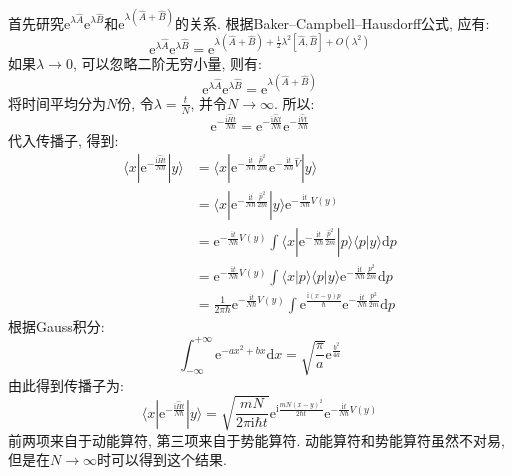         首先研究$\mathrm{e}^{\lambda \hat{A}}\mathrm{e}^{\lambda \hat{B}}$和$\mathrm{e}^{\lambda (\hat{A}+\hat{B})}$的关系. 根据Baker–Campbell–Hausdorff公式, 应有:
        \begin{equation}
            \mathrm{e}^{\lambda \hat{A}} \mathrm{e}^{\lambda \hat{B}} = \mathrm{e}^{\lambda (\hat{A}+\hat{B}) + \frac 12 \lambda^2 [\hat{A},\hat{B}] + O(\lambda^2)}
        \end{equation}
        如果$\lambda \to 0$, 可以忽略二阶无穷小量, 则有:
        \begin{equation}
            \mathrm{e}^{\lambda \hat{A}} \mathrm{e}^{\lambda \hat{B}} = \mathrm{e}^{\lambda (\hat{A}+\hat{B})}
        \end{equation}
        将时间平均分为$N$份, 令$\lambda = \frac tN$, 并令$N \to \infty$. 所以:
        \begin{equation}
            \mathrm{e}^{-\frac {\mathrm{i}\hat{H}t}{N\hbar}} = \mathrm{e}^{-\frac {\mathrm{i}\hat{K}t}{N\hbar}} \mathrm{e}^{-\frac {\mathrm{i}\hat{V}t}{N\hbar}}
        \end{equation}
        代入传播子, 得到:
        \begin{equation}\begin{aligned}
            \langle x | \mathrm{e}^{-\frac {\mathrm{i}\hat{H}t}{N\hbar}} | y \rangle &= \langle x | \mathrm{e}^{-\frac {\mathrm{i}t}{N\hbar}\frac {\hat{p}^2}{2m}} 
            \mathrm{e}^{-\frac {\mathrm{i}t}{N\hbar}\hat{V}} |y \rangle\\
            &= \langle x | \mathrm{e}^{- \frac{\mathrm{i}t}{N\hbar} \frac{\hat{p}^2}{2m}} |y \rangle \mathrm{e}^{-\frac {\mathrm{i}t}{N\hbar}V(y)} \\
            &= \mathrm{e}^{-\frac {\mathrm{i}t}{N\hbar}V(y)} \int \langle x | \mathrm{e}^{-\frac {\mathrm{i}t}{N\hbar}\frac {\hat{p}^2}{2m}} |p \rangle \langle p |y \rangle \mathrm{d}p \\
            &= \mathrm{e}^{-\frac {\mathrm{i}t}{N\hbar}V(y)} \int \langle x|p \rangle \langle p|y \rangle \mathrm{e}^{-\frac {\mathrm{i}t}{N\hbar}\frac {p^2}{2m}} \mathrm{d}p\\
            &= \frac 1{2\pi \hbar} \mathrm{e}^{-\frac {\mathrm{i}t}{N\hbar}V(y)} \int \mathrm{e}^{\frac {\mathrm{i}(x-y)p}{\hbar}} \mathrm{e}^{-\frac {\mathrm{i}t}{N\hbar}\frac {p^2}{2m}} \mathrm{d} p
        \end{aligned}\end{equation}
        根据Gauss积分:
        \begin{equation}
            \int_{-\infty}^{+\infty} \mathrm{e}^{-ax^2+bx} \mathrm{d}x = \sqrt{\frac {\pi}a} \mathrm{e}^{\frac {b^2}{4a}}
        \end{equation}
        由此得到传播子为:
        \begin{equation}
            \langle x | \mathrm{e}^{-\frac {\mathrm{i}\hat{H}t}{N\hbar}} | y \rangle = \sqrt{\frac {mN}{2\pi\mathrm{i} \hbar t}} \mathrm{e}^{\mathrm{i}\frac {mN(x-y)^2}{2\hbar t}}\mathrm{e}^{-\frac {\mathrm{i}t}{N\hbar} V(y)}
        \end{equation}
        前两项来自于动能算符, 第三项来自于势能算符. 动能算符和势能算符虽然不对易, 但是在$N \to \infty$时可以得到这个结果. 

